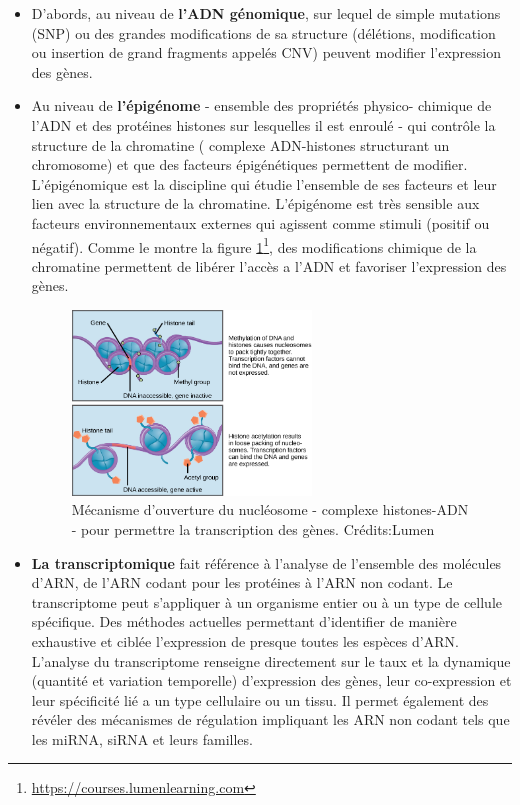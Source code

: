 \begin{itemize}
    \item D'abords, au niveau de \textbf{l'ADN génomique}, sur lequel de simple mutations (SNP) ou des grandes modifications de sa structure (délétions, modification ou insertion de grand fragments appelés CNV) peuvent modifier l'expression des gènes.\\
    
    \item  Au niveau de \textbf{l'épigénome} - ensemble des propriétés physico- chimique de l'ADN et des protéines histones sur lesquelles il est enroulé - qui contrôle la structure de la chromatine ( complexe ADN-histones structurant un chromosome) et que des facteurs épigénétiques permettent de modifier. L'épigénomique est la discipline qui étudie l'ensemble de ses facteurs et leur lien avec la structure de la chromatine. L'épigénome est très sensible aux facteurs environnementaux externes qui agissent comme stimuli (positif ou négatif). Comme le montre la figure \ref{fig:epigenet}\footnote{\url{https://courses.lumenlearning.com}}, des modifications chimique de la chromatine permettent de libérer l'accès a l'ADN et favoriser l'expression des gènes.
    
    \begin{figure}[!ht]
    \centering
    \includegraphics[width=0.6\textwidth]{hdr_manuscript/Figures/epigenet.png}
    \caption{Mécanisme d'ouverture du nucléosome - complexe histones-ADN - pour permettre la transcription des gènes. Crédits:Lumen}
    \label{fig:epigenet}
    \end{figure}

    \item \textbf{La transcriptomique} fait référence à l'analyse de l'ensemble des molécules d'ARN, de l'ARN codant pour les protéines à l'ARN non codant. Le transcriptome peut s’appliquer à un organisme entier ou à un type de cellule spécifique. Des méthodes actuelles permettant d'identifier de manière exhaustive et ciblée l'expression de presque toutes les espèces d'ARN. L'analyse du transcriptome renseigne directement sur le taux et la dynamique (quantité et variation temporelle) d'expression des gènes, leur co-expression et leur spécificité lié a un type cellulaire ou un tissu. Il permet également des révéler des mécanismes de régulation impliquant les ARN non codant tels que les miRNA, siRNA et leurs familles.  \\
    

\end{itemize}

